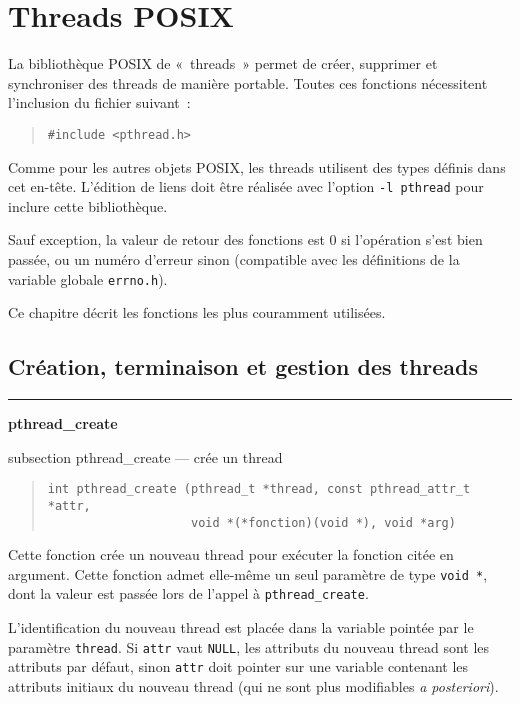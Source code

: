 \documentclass [twoside] {report}
\newcommand {\primitive} [1]
    {
	{\large \bf #1}
	\addcontentsline {toc} {subsection} {#1}
    }
\newcommand {\separation}
    {
	\vspace {7mm}
	\nopagebreak
	\hrule
    }
\begin{document}
\cleardoublepage
\chapter {Threads POSIX}

La bibliothèque POSIX de «~threads~» permet de créer, supprimer et
synchroniser des threads de manière portable. Toutes ces fonctions
nécessitent l'inclusion du fichier suivant~:

\begin {quote}
\begin {verbatim}
#include <pthread.h>
\end{verbatim}
\end {quote}

Comme pour les autres objets POSIX, les threads utilisent des types
définis dans cet en-tête. L'édition de liens doit être réalisée avec
l'option \verb|-l pthread| pour inclure cette bibliothèque.

Sauf exception, la valeur de retour des fonctions est 0 si l'opération
s'est bien passée, ou un numéro d'erreur sinon (compatible avec les
définitions de la variable globale \texttt {errno.h}).

Ce chapitre décrit les fonctions les plus couramment utilisées.


\section {Création, terminaison et gestion des threads}

\separation 
\primitive {pthread\_create} --- crée un thread

\begin {quote}
\begin {verbatim}
int pthread_create (pthread_t *thread, const pthread_attr_t *attr,
                    void *(*fonction)(void *), void *arg)
\end{verbatim}
\end {quote}

Cette fonction crée un nouveau thread pour exécuter la fonction
citée en argument. Cette fonction admet elle-même un seul paramètre
de type \verb|void *|, dont la valeur est passée lors de l'appel à
\verb|pthread_create|.

L'identification du nouveau thread est placée dans la variable pointée
par le paramètre \texttt {thread}. Si \texttt {attr} vaut \texttt {NULL},
les attributs du nouveau thread sont les attributs par défaut, sinon
\texttt {attr} doit pointer sur une variable contenant les attributs
initiaux du nouveau thread (qui ne sont plus modifiables \textit {a
posteriori}).
\end{document}

